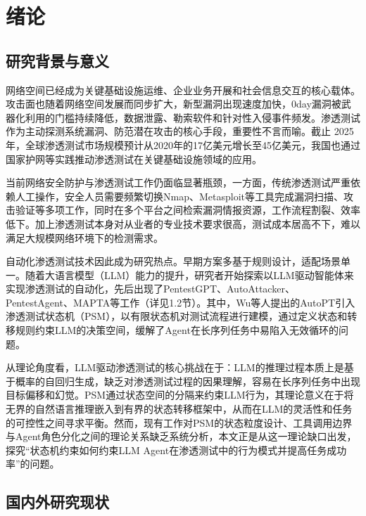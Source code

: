 
\chapter{绪论}

\section{研究背景与意义}

网络空间已经成为关键基础设施运维、企业业务开展和社会信息交互的核心载体。攻击面也随着网络空间发展而同步扩大，新型漏洞出现速度加快，0day漏洞被武器化利用的门槛持续降低，数据泄露、勒索软件和针对性入侵事件频发\cite{Liu2024AutoScan}。渗透测试作为主动探测系统漏洞、防范潜在攻击的核心手段，重要性不言而喻。截止 2025 年，全球渗透测试市场规模预计从2020年的17亿美元增长至45亿美元\cite{Liu2024AutoScan}，我国也通过国家护网等实践推动渗透测试在关键基础设施领域的应用。

当前网络安全防护与渗透测试工作仍面临显著瓶颈，一方面，传统渗透测试严重依赖人工操作，安全人员需要频繁切换Nmap、Metasploit等工具完成漏洞扫描、攻击验证等多项工作，同时在多个平台之间检索漏洞情报资源，工作流程割裂、效率低下\cite{Wu2023PenTest}。加上渗透测试本身对从业者的专业技术要求很高，测试成本居高不下，难以满足大规模网络环境下的检测需求。

自动化渗透测试技术因此成为研究热点。早期方案多基于规则设计\cite{Liu2024AutoScan}，适配场景单一。随着大语言模型（LLM）能力的提升，研究者开始探索以LLM驱动智能体来实现渗透测试的自动化\cite{Isozaki2025Towards}，先后出现了PentestGPT\cite{Deng2024PentestGPT}、AutoAttacker\cite{Xu2024AutoAttacker}、PentestAgent\cite{Shen2025PentestAgent}、MAPTA\cite{David2025MAPTA}等工作（详见1.2节）。其中，Wu等人提出的AutoPT\cite{Wu2024AutoPT}引入渗透测试状态机（PSM），以有限状态机对测试流程进行建模，通过定义状态和转移规则约束LLM的决策空间，缓解了Agent在长序列任务中易陷入无效循环的问题。

从理论角度看，LLM驱动渗透测试的核心挑战在于：LLM的推理过程本质上是基于概率的自回归生成，缺乏对渗透测试过程的因果理解，容易在长序列任务中出现目标偏移和幻觉。PSM通过状态空间的分隔来约束LLM行为，其理论意义在于将无界的自然语言推理嵌入到有界的状态转移框架中，从而在LLM的灵活性和任务的可控性之间寻求平衡。然而，现有工作对PSM的状态粒度设计、工具调用边界与Agent角色分化之间的理论关系缺乏系统分析，本文正是从这一理论缺口出发，探究“状态机约束如何约束LLM Agent在渗透测试中的行为模式并提高任务成功率”的问题。

\section{国内外研究现状}

